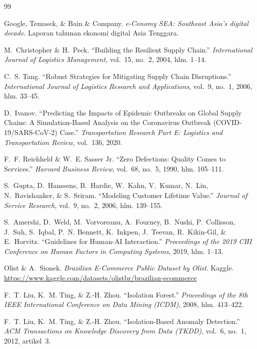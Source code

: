 \documentclass[12pt,a4paper]{article}
\begin{document}
\newpage
\begin{thebibliography}{99}\footnotesize{}

Google, Temasek, \& Bain \& Company. \textit{e-Conomy SEA: Southeast Asia's digital decade}. Laporan tahunan ekonomi digital Asia Tenggara.

M.~Christopher \& H.~Peck. ``Building the Resilient Supply Chain.'' \textit{International Journal of Logistics Management}, vol.~15, no.~2, 2004, hlm. 1--14.

C.~S. Tang. ``Robust Strategies for Mitigating Supply Chain Disruptions.'' \textit{International Journal of Logistics Research and Applications}, vol.~9, no.~1, 2006, hlm. 33--45.

D.~Ivanov. ``Predicting the Impacts of Epidemic Outbreaks on Global Supply Chains: A Simulation-Based Analysis on the Coronavirus Outbreak (COVID-19/SARS-CoV-2) Case.'' \textit{Transportation Research Part E: Logistics and Transportation Review}, vol.~136, 2020.

F.~F. Reichheld \& W.~E. Sasser Jr. ``Zero Defections: Quality Comes to Services.'' \textit{Harvard Business Review}, vol.~68, no.~5, 1990, hlm. 105--111.

S.~Gupta, D.~Hanssens, B.~Hardie, W.~Kahn, V.~Kumar, N.~Lin, N.~Ravishanker, \& S.~Sriram. ``Modeling Customer Lifetime Value.'' \textit{Journal of Service Research}, vol.~9, no.~2, 2006, hlm. 139--155.

S.~Amershi, D.~Weld, M.~Vorvoreanu, A.~Fourney, B.~Nushi, P.~Collisson, J.~Suh, S.~Iqbal, P.~N. Bennett, K.~Inkpen, J.~Teevan, R.~Kikin-Gil, \& E.~Horvitz. ``Guidelines for Human-AI Interaction.'' \textit{Proceedings of the 2019 CHI Conference on Human Factors in Computing Systems}, 2019, hlm. 1--13.

Olist \& A.~Sionek. \textit{Brazilian E-Commerce Public Dataset by Olist}. Kaggle. \url{https://www.kaggle.com/datasets/olistbr/brazilian-ecommerce}

F.~T. Liu, K.~M. Ting, \& Z.-H. Zhou. ``Isolation Forest.'' \textit{Proceedings of the 8th IEEE International Conference on Data Mining (ICDM)}, 2008, hlm. 413--422.

F.~T. Liu, K.~M. Ting, \& Z.-H. Zhou. ``Isolation-Based Anomaly Detection.'' \textit{ACM Transactions on Knowledge Discovery from Data (TKDD)}, vol.~6, no.~1, 2012, artikel~3.


\end{thebibliography}
\end{document}
